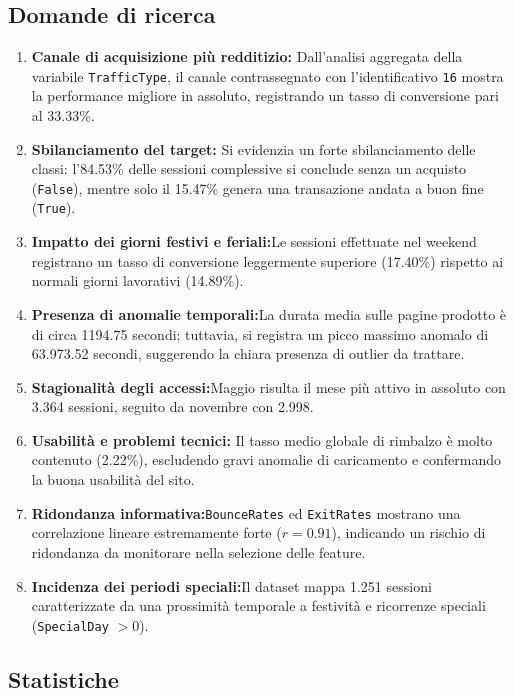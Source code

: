 \documentclass[11pt,a4paper]{article}
\begin{document}
\subsection{Domande di ricerca}
\begin{enumerate}
    \item \textbf{Canale di acquisizione più redditizio:} Dall'analisi aggregata della variabile \texttt{TrafficType}, il canale contrassegnato con l'identificativo \texttt{16} mostra la performance migliore in assoluto, registrando un tasso di conversione pari al 33.33\%.
    \item \textbf{Sbilanciamento del target:} Si evidenzia un forte sbilanciamento delle classi: l'84.53\% delle sessioni complessive si conclude senza un acquisto (\texttt{False}), mentre solo il 15.47\% genera una transazione andata a buon fine (\texttt{True}).
    \item \textbf{Impatto dei giorni festivi e feriali:}Le sessioni effettuate nel weekend registrano un tasso di conversione leggermente superiore (17.40\%) rispetto ai normali giorni lavorativi (14.89\%).
    \item \textbf{Presenza di anomalie temporali:}La durata media sulle pagine prodotto è di circa 1194.75 secondi; tuttavia, si registra un picco massimo anomalo di 63.973.52 secondi, suggerendo la chiara presenza di outlier da trattare.
    \item \textbf{Stagionalità degli accessi:}Maggio risulta il mese più attivo in assoluto con 3.364 sessioni, seguito da novembre con 2.998.
    \item \textbf{Usabilità e problemi tecnici:} Il tasso medio globale di rimbalzo è molto contenuto (2.22\%), escludendo gravi anomalie di caricamento e confermando la buona usabilità del sito.
    \item \textbf{Ridondanza informativa:}\texttt{BounceRates} ed \texttt{ExitRates} mostrano una correlazione lineare estremamente forte ($r = 0.91$), indicando un rischio di ridondanza da monitorare nella selezione delle feature.
    \item \textbf{Incidenza dei periodi speciali:}Il dataset mappa 1.251 sessioni caratterizzate da una prossimità temporale a festività e ricorrenze speciali (\texttt{SpecialDay} $> 0$).
\end{enumerate}

\subsection{Statistiche}
\end{document}
